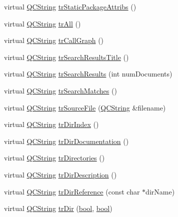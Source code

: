 \begin{DoxyCompactItemize}
\item 
virtual \hyperlink{class_q_c_string}{Q\+C\+String} \hyperlink{class_translator_chinesetraditional_a39d7a776bf00a1231a1688751fd710ef}{tr\+Static\+Package\+Attribs} ()
\item 
virtual \hyperlink{class_q_c_string}{Q\+C\+String} \hyperlink{class_translator_chinesetraditional_aa1b51ab16b0482c3bd451cb82dceb6f7}{tr\+All} ()
\item 
virtual \hyperlink{class_q_c_string}{Q\+C\+String} \hyperlink{class_translator_chinesetraditional_a618b1ac3e4855df1ae6c15c49a79d64c}{tr\+Call\+Graph} ()
\item 
virtual \hyperlink{class_q_c_string}{Q\+C\+String} \hyperlink{class_translator_chinesetraditional_ad8c097af58cce68a9c3eb92788ea5750}{tr\+Search\+Results\+Title} ()
\item 
virtual \hyperlink{class_q_c_string}{Q\+C\+String} \hyperlink{class_translator_chinesetraditional_a2edcc9f96cb11de3b749f8cbb55bf159}{tr\+Search\+Results} (int num\+Documents)
\item 
virtual \hyperlink{class_q_c_string}{Q\+C\+String} \hyperlink{class_translator_chinesetraditional_a4be8eccb74260c7d8fd07045bc1ec135}{tr\+Search\+Matches} ()
\item 
virtual \hyperlink{class_q_c_string}{Q\+C\+String} \hyperlink{class_translator_chinesetraditional_aead901c951de5396b578db9364fc45b4}{tr\+Source\+File} (\hyperlink{class_q_c_string}{Q\+C\+String} \&filename)
\item 
virtual \hyperlink{class_q_c_string}{Q\+C\+String} \hyperlink{class_translator_chinesetraditional_a23a47a7d90fd4f1c79b1f89ad851a2fd}{tr\+Dir\+Index} ()
\item 
virtual \hyperlink{class_q_c_string}{Q\+C\+String} \hyperlink{class_translator_chinesetraditional_a963d993d8ff90c7c31418a6619587786}{tr\+Dir\+Documentation} ()
\item 
virtual \hyperlink{class_q_c_string}{Q\+C\+String} \hyperlink{class_translator_chinesetraditional_a7d0523cee408b8a61b6805765ef58965}{tr\+Directories} ()
\item 
virtual \hyperlink{class_q_c_string}{Q\+C\+String} \hyperlink{class_translator_chinesetraditional_aee48759aa26beb5da06054ce369b664e}{tr\+Dir\+Description} ()
\item 
virtual \hyperlink{class_q_c_string}{Q\+C\+String} \hyperlink{class_translator_chinesetraditional_af0b29374505eb9f3e3fc38c766c122a9}{tr\+Dir\+Reference} (const char $\ast$dir\+Name)
\item 
virtual \hyperlink{class_q_c_string}{Q\+C\+String} \hyperlink{class_translator_chinesetraditional_aa58d8becc977f4dc7fc422c93f124f92}{tr\+Dir} (\hyperlink{qglobal_8h_a1062901a7428fdd9c7f180f5e01ea056}{bool}, \hyperlink{qglobal_8h_a1062901a7428fdd9c7f180f5e01ea056}{bool})

\end{DoxyCompactItemize}
